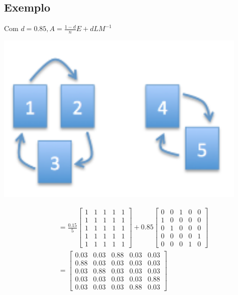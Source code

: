 \documentclass[
  letterpaper,
  DIV=11,
  numbers=noendperiod]{scrartcl}
\begin{document}
\hypertarget{exemplo-1}{%
\subsection{Exemplo}\label{exemplo-1}}

Com \(d = 0.85, A= \frac{1-d}{n}E + d LM^{-1}\)

\includegraphics{figs/Aula09/exemplo_BR.png}

\begin{align}
&= \frac{0.15}{5}\begin{bmatrix}1 & 1 & 1 & 1 & 1\\1 & 1 & 1 & 1 & 1\\1 & 1 & 1 & 1 & 1\\1 & 1 & 1 & 1 & 1\\1 & 1 & 1 & 1 & 1\end{bmatrix} + 0.85\begin{bmatrix}0 & 0 & 1 & 0 & 0\\1 & 0 & 0 & 0 & 0\\0 & 1 & 0 & 0 & 0\\0 & 0 & 0 & 0 & 1\\0 & 0 & 0 & 1 & 0\end{bmatrix}\\

&= \begin{bmatrix}0.03 & 0.03 & 0.88 & 0.03 & 0.03\\0.88 & 0.03 & 0.03 & 0.03 & 0.03\\0.03 & 0.88 & 0.03 & 0.03 & 0.03\\0.03 & 0.03 & 0.03 & 0.03 & 0.88\\0.03 & 0.03 & 0.03 & 0.88 & 0.03\end{bmatrix}
\end{align}
\end{document}
